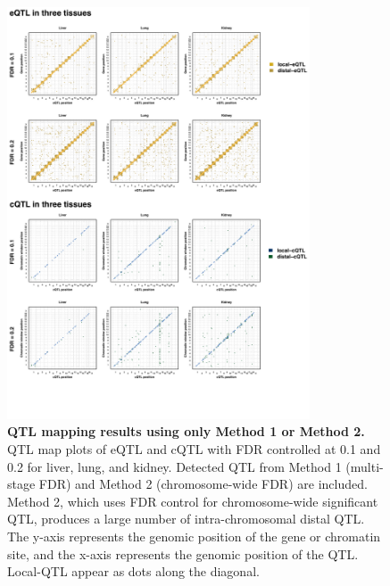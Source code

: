 \documentclass[9pt,twocolumn,twoside]{gsajnl}
\begin{document}
\begin{figure}[h]
\renewcommand{\familydefault}{\sfdefault}\normalfont
\centering
\includegraphics[width=0.8\textwidth, trim={0in 1.5in 0in 0in}, clip]{figs/qtl_map_supplemental.pdf}
\caption{\textbf{QTL mapping results using only Method 1 or Method 2.} QTL map plots of eQTL and cQTL with FDR controlled at 0.1 and 0.2 for liver, lung, and kidney. Detected QTL from Method 1 (multi-stage FDR) and Method 2 (chromosome-wide FDR) are included. Method 2, which uses FDR control for chromosome-wide significant QTL, produces a large number of intra-chromosomal distal QTL. The y-axis represents the genomic position of the gene or chromatin site, and the x-axis represents the genomic position of the QTL. Local-QTL appear as dots along the diagonal.
\label{fig:grid_fdr_plot}}
\end{figure}
\end{document}
